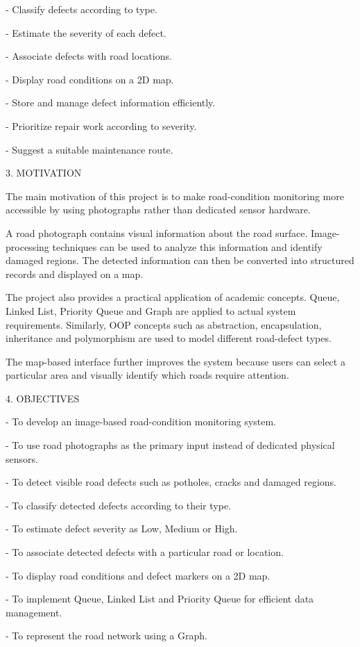 \documentclass[
]{article}
\begin{document}
- Classify defects according to type.

- Estimate the severity of each defect.

- Associate defects with road locations.

- Display road conditions on a 2D map.

- Store and manage defect information efficiently.

- Prioritize repair work according to severity.

- Suggest a suitable maintenance route.

3. MOTIVATION

The main motivation of this project is to make road-condition monitoring
more accessible by using photographs rather than dedicated sensor
hardware.

A road photograph contains visual information about the road surface.
Image-processing techniques can be used to analyze this information and
identify damaged regions. The detected information can then be converted
into structured records and displayed on a map.

The project also provides a practical application of academic concepts.
Queue, Linked List, Priority Queue and Graph are applied to actual
system requirements. Similarly, OOP concepts such as abstraction,
encapsulation, inheritance and polymorphism are used to model different
road-defect types.

The map-based interface further improves the system because users can
select a particular area and visually identify which roads require
attention.

4. OBJECTIVES

- To develop an image-based road-condition monitoring system.

- To use road photographs as the primary input instead of dedicated
physical sensors.

- To detect visible road defects such as potholes, cracks and damaged
regions.

- To classify detected defects according to their type.

- To estimate defect severity as Low, Medium or High.

- To associate detected defects with a particular road or location.

- To display road conditions and defect markers on a 2D map.

- To implement Queue, Linked List and Priority Queue for efficient data
management.

- To represent the road network using a Graph.
\end{document}
